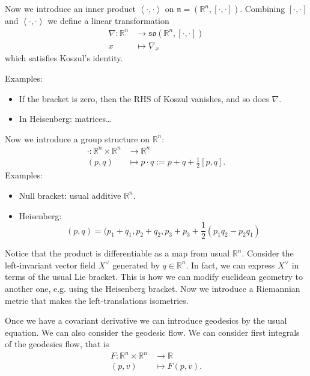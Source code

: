 \noindent
Now we introduce an inner product 
$\left<\cdot,\cdot\right>$ on
$\mathfrak{n}=(\mathbb{R}^n,[\cdot,\cdot])$.
Combining $[\cdot,\cdot]$ and
$\left<\cdot,\cdot\right>$
we define a linear transformation
$$
\begin{aligned}
\nabla: \mathbb{R}^n &\longrightarrow 
\mathfrak{so}(\mathbb{R}^n,[\cdot,\cdot]) \\
x &\longmapsto \nabla_x
\end{aligned}
$$
which satisfies Koszul's identity.

Examples:
\begin{itemize}
\item If the bracket is zero,
then the RHS of Koszul vanishes, and so
does $\nabla$.

\item In Heisenberg: matrices…
\end{itemize}

\medskip\noindent
Now we introduce a group structure on
$\mathbb{R}^n$:
$$
\begin{aligned}
\cdot: \mathbb{R}^n\times \mathbb{R}^n &\longrightarrow  
\mathbb{R}^n\\
(p,q) &\longmapsto p\cdot q:=
p+q+ \frac{1}{2}[p,q].
\end{aligned}
$$
Examples:
\begin{itemize}
\item Null bracket: usual additive
$\mathbb{R}^n$.

\item Heisenberg:
$$
(p,q)=(p_1+q_1,p_2+q_2,
p_3+p_3+\frac{1}{2}(p_1q_2-p_2q_1)
$$
\end{itemize}

\noindent
Notice that the product is differentiable
as a map from usual $\mathbb{R}^n$.
Consider the left-invariant vector field 
$X^\vee$
generated by $q \in \mathbb{R}^n$.
In fact, we can express $X^\vee$
in terms of the usual Lie bracket.
This is how we can modify euclidean geometry
to another one, e.g. using the Heisenberg
bracket. Now we introduce a Riemannian
metric that makes the left-translations
isometries.

Once we have a covariant derivative
we can introduce geodesics by the usual
equation. We can also consider the geodesic
flow. We can consider first integrals
of the geodesics flow, that is
$$
\begin{aligned}
F: \mathbb{R}^n\times\mathbb{R}^n
&\longrightarrow \mathbb{R} \\
(p,v) &\longmapsto F(p,v).
\end{aligned}
$$

